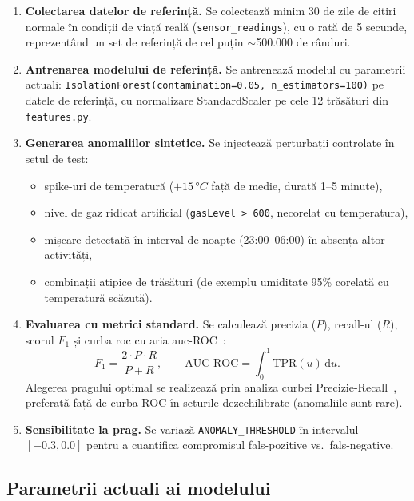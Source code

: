 \begin{enumerate}
  \item \textbf{Colectarea datelor de referință.} Se colectează minim 30 de zile de citiri
    normale în condiții de viață reală (\texttt{sensor\_readings}), cu o rată de 5 secunde,
    reprezentând un set de referință de cel puțin $\sim$500.000 de rânduri.

  \item \textbf{Antrenarea modelului de referință.} Se antrenează modelul cu parametrii actuali:
    \texttt{IsolationForest(contamination=0.05, n\_estimators=100)} pe datele de referință,
    cu normalizare StandardScaler pe cele 12 trăsături din \texttt{features.py}.

  \item \textbf{Generarea anomaliilor sintetice.} Se injectează perturbații controlate în setul
    de test:
    \begin{itemize}
      \item spike-uri de temperatură ($+15\,°C$ față de medie, durată 1–5 minute),
      \item nivel de gaz ridicat artificial (\texttt{gasLevel > 600}, necorelat cu temperatura),
      \item mișcare detectată în interval de noapte (23:00–06:00) în absența altor activități,
      \item combinații atipice de trăsături (de exemplu umiditate 95\% corelată cu temperatură scăzută).
    \end{itemize}

  \item \textbf{Evaluarea cu metrici standard.} Se calculează precizia ($P$), recall-ul ($R$),
    scorul $F_1$ și curba \gls{roc} cu aria \gls{auc}-ROC~\cite{fawcett2006roc,davis2006prcurve}:
    \[
      F_1 = \frac{2 \cdot P \cdot R}{P + R}, \qquad
      \text{AUC-ROC} = \int_0^1 \text{TPR}(u)\,\mathrm{d}u.
    \]
    Alegerea pragului optimal se realizează prin analiza curbei Precizie-Recall~\cite{davis2006prcurve},
    preferată față de curba ROC în seturile dezechilibrate (anomaliile sunt rare).

  \item \textbf{Sensibilitate la prag.} Se variază \texttt{ANOMALY\_THRESHOLD} în intervalul
    $[-0.3, 0.0]$ pentru a cuantifica compromisul fals-pozitive vs.\ fals-negative.
\end{enumerate}

\subsection{Parametrii actuali ai modelului}

